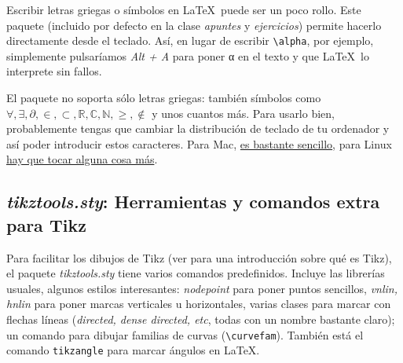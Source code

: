 Escribir letras griegas o símbolos en \LaTeX\ puede ser un poco rollo. Este paquete (incluido por defecto en la clase \textit{apuntes} y \textit{ejercicios}) permite hacerlo directamente desde el teclado. Así, en lugar de escribir \verb|\alpha|, por ejemplo, simplemente pulsaríamos \textit{Alt + A} para poner α en el texto y que \LaTeX\ lo interprete sin fallos.

El paquete no soporta sólo letras griegas: también símbolos como $∀, ∃, ∂, ∈, ⊂, ℝ, ℂ, ℕ, ≥, ∉$ y unos cuantos más. Para usarlo bien, probablemente tengas que cambiar la distribución de teclado de tu ordenador y así poder introducir estos caracteres. Para Mac, \href{https://github.com/gjulianm/MathUnicode}{es bastante sencillo}, para Linux \href{https://github.com/VicdeJuan/Apuntes/tree/master/Cosas%20guays%20LaTeX/ConfiguracionTeclado}{hay que tocar alguna cosa más}.

\subsection{\textit{tikztools.sty}: Herramientas y comandos extra para Tikz}
\label{sec:Tikztools}

Para facilitar los dibujos de Tikz (ver  para una introducción sobre qué es Tikz), el paquete \textit{tikztools.sty} tiene varios comandos predefinidos. Incluye las librerías usuales, algunos estilos interesantes: \textit{nodepoint} para poner puntos sencillos, \textit{vnlin, hnlin} para poner marcas verticales u horizontales, varias clases para marcar con flechas líneas (\textit{directed, dense directed, etc}, todas con un nombre bastante claro); un comando para dibujar familias de curvas (\verb|\curvefam|). También está el comando \texttt{tikzangle} para marcar ángulos en LaTeX.

